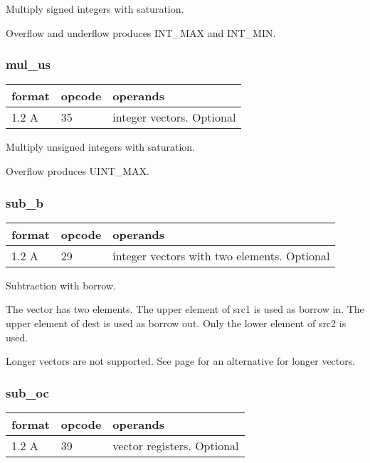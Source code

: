 \documentclass[forwardcom.tex]{subfiles}
\begin{document}
Multiply signed integers with saturation.

Overflow and underflow produces INT\_MAX and INT\_MIN.

\subsubsection{mul\_us}
\label{table:mulUsInstruction}
\begin{tabular}{|p{12mm}|p{12mm}|p{110mm}|}
\hline
\bfseries format & \bfseries opcode & \bfseries operands \\ \hline
1.2 A & 35 & integer vectors. Optional \\ \hline
\end{tabular}
\vspace{2mm}

Multiply unsigned integers with saturation.

Overflow produces UINT\_MAX.

\subsubsection{sub\_b}
\label{table:subBInstruction}
\begin{tabular}{|p{12mm}|p{12mm}|p{110mm}|}
\hline
\bfseries format & \bfseries opcode & \bfseries operands \\ \hline
1.2 A & 29 & integer vectors with two elements. Optional \\ \hline
\end{tabular}
\vspace{2mm}

Subtraction with borrow.
\vspace{2mm}

The vector has two elements. The upper element of src1 is used as borrow in. The upper element of dest is used as borrow out. Only the lower element of src2 is used.
\vspace{2mm}

Longer vectors are not supported. See page 
\pageref{highPrecisionArithmetic} for an alternative for longer vectors.

\subsubsection{sub\_oc}
\label{table:subOcInstruction}
\begin{tabular}{|p{12mm}|p{12mm}|p{110mm}|}
\hline
\bfseries format & \bfseries opcode & \bfseries operands \\ \hline
1.2 A & 39 & vector registers. Optional \\ \hline
\end{tabular}
\vspace{2mm}
\end{document}
